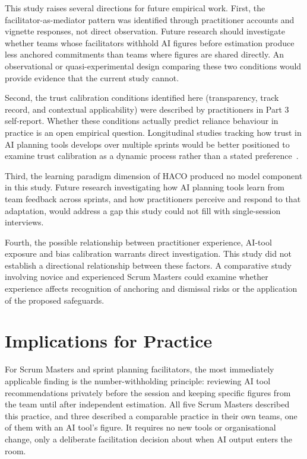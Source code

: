 \documentclass[a4paper,twoside]{bth}
\begin{document}
This study raises several directions for future empirical work. First, the facilitator-as-mediator pattern was identified through practitioner accounts and vignette responses, not direct observation. Future research should investigate whether teams whose facilitators withhold AI figures before estimation produce less anchored commitments than teams where figures are shared directly. An observational or quasi-experimental design comparing these two conditions would provide evidence that the current study cannot.

Second, the trust calibration conditions identified here (transparency, track record, and contextual applicability) were described by practitioners in Part 3 self-report. Whether these conditions actually predict reliance behaviour in practice is an open empirical question. Longitudinal studies tracking how trust in AI planning tools develops over multiple sprints would be better positioned to examine trust calibration as a dynamic process rather than a stated preference~\cite{lee2004trust}.

Third, the learning paradigm dimension of HACO produced no model component in this study. Future research investigating how AI planning tools learn from team feedback across sprints, and how practitioners perceive and respond to that adaptation, would address a gap this study could not fill with single-session interviews.

Fourth, the possible relationship between practitioner experience, AI-tool exposure and bias calibration warrants direct investigation. This study did not establish a directional relationship between these factors. A comparative study involving novice and experienced Scrum Masters could examine whether experience affects recognition of anchoring and dismissal risks or the application of the proposed safeguards.

\section{Implications for Practice}

For Scrum Masters and sprint planning facilitators, the most immediately applicable finding is the number-withholding principle: reviewing AI tool recommendations privately before the session and keeping specific figures from the team until after independent estimation. All five Scrum Masters described this practice, and three described a comparable practice in their own teams, one of them with an AI tool's figure. It requires no new tools or organisational change, only a deliberate facilitation decision about when AI output enters the room.
\end{document}
